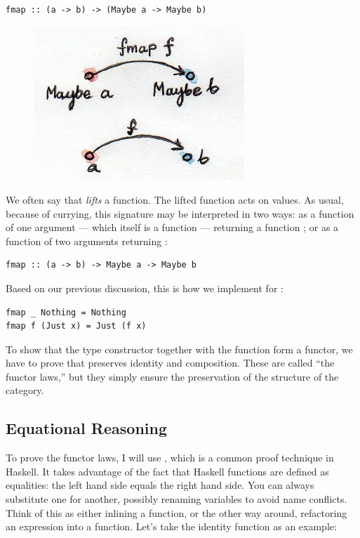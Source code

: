 \begin{Verbatim}
fmap :: (a -> b) -> (Maybe a -> Maybe b)
\end{Verbatim}

\begin{figure}[H]
\centering
\includegraphics[width=3.12500in]{images/functormaybe.jpg}
\end{figure}

\noindent
We often say
that  \emph{lifts} a function. The lifted function acts on
 values. As usual, because of currying, this signature may
be interpreted in two ways: as a function of one argument --- which
itself is a function  --- returning a
function ; or as a
function of two arguments returning :

\begin{Verbatim}
fmap :: (a -> b) -> Maybe a -> Maybe b
\end{Verbatim}
Based on our previous discussion, this is how we implement 
for :

\begin{Verbatim}
fmap _ Nothing = Nothing
fmap f (Just x) = Just (f x)
\end{Verbatim}
To show that the type constructor  together with the
function  form a functor, we have to prove that
 preserves identity and composition. These are called ``the
functor laws,'' but they simply ensure the preservation of the structure
of the category.

\subsection{Equational Reasoning}

To prove the functor laws, I will use , which
is a common proof technique in Haskell. It takes advantage of the fact
that Haskell functions are defined as equalities: the left hand side
equals the right hand side. You can always substitute one for another,
possibly renaming variables to avoid name conflicts. Think of this as
either inlining a function, or the other way around, refactoring an
expression into a function. Let's take the identity function as an
example:

